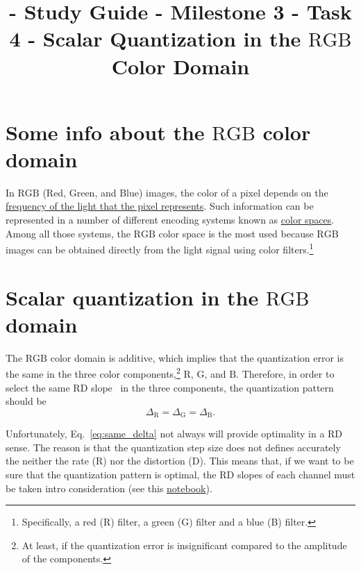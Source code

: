 

\title{\SM{} - Study Guide - Milestone 3 - Task 4 - Scalar Quantization in the $\text{RGB}$ Color Domain}

\maketitle

\tableofcontents

\section{Some info about the $\text{RGB}$ color domain}

In $\text{RGB}$ (Red, Green, and Blue) images, the color of a pixel
depends on the
\href{https://en.wikipedia.org/wiki/Visible_spectrum}{frequency of the
  light that the pixel represents}. Such information can be
represented in a number of different encoding systems known as
\href{https://en.wikipedia.org/wiki/Color_space}{color spaces}. Among
all those systems, the $\text{RGB}$ color space is the most used
because $\text{RGB}$ images can be obtained directly from the light
signal using color filters.\footnote{Specifically, a red (R) filter, a
green (G) filter and a blue (B) filter.}


\section{Scalar quantization in the $\text{RGB}$ domain}

The $\text{RGB}$ color domain is additive, which implies that the
quantization error is the same in the three color
components,\footnote{At least, if the quantization error is
insignificant compared to the amplitude of the components.}
$\text{R}$, $\text{G}$, and $\text{B}$. Therefore, in order to select
the same RD slope~\cite{vruiz__information_theory} in the three
components, the quantization pattern should be
\begin{equation}
  \Delta_\text{R} = \Delta_\text{G} = \Delta_\text{B}.
  \label{eq:same_delta}
\end{equation}

Unfortunately, Eq.~\eqref{eq:same_delta} not always will provide
optimality in a RD sense. The reason is that the quantization step
size does not defines accurately the neither the rate (R) nor the
distortion (D). This means that, if we want to be sure that the
quantization pattern is optimal, the RD slopes of each channel must be
taken intro consideration (see this
\href{https://github.com/Sistemas-Multimedia/Sistemas-Multimedia.github.io/blob/master/contents/RGB_quantization/RD_performance.ipynb}{notebook}).

